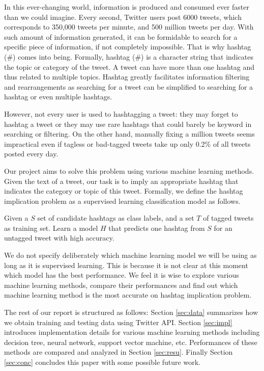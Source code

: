 \documentclass[letterpaper,11pt,twocolumn]{article}
\begin{document}
In this ever-changing world, information is produced and consumed ever faster than we could imagine. Every second, Twitter users post 6000 tweets, which corresponds to 350,000 tweets per minute, and 500 million tweets per day. With such amount of information generated, it can be formidable to search for a specific piece of information, if not completely impossible. That is why hashtag (\#) comes into being. Formally, hashtag (\#) is a character string that indicates the topic or category of the tweet. A tweet can have more than one hashtag and thus related to multiple topics. Hashtag greatly facilitates information filtering and rearrangements as searching for a tweet can be simplified to searching for a hashtag or even multiple hashtags.

However, not every user is used to hashtagging a tweet: they may forget to hashtag a tweet or they may use rare hashtags that could barely be keyword in searching or filtering. On the other hand, manually fixing a million tweets seems impractical even if tagless or bad-tagged tweets take up only 0.2\% of all tweets posted every day.

Our project aims to solve this problem using various machine learning methods. Given the text of a tweet, our task is to imply an appropriate hashtag that indicates the category or topic of this tweet. Formally, we define the hashtag implication problem as a supervised learning classification model as follows.

\begin{definition}
Given a $S$ set of candidate hashtags as class labels, and a set $T$ of tagged tweets as training set. Learn a model $H$ that predicts one hashtag from $S$ for an untagged tweet with high accuracy.
\end{definition}

We do not specify deliberately which machine learning model we will be using as long as it is supervised learning. This is because it is not clear at this moment which model has the best performance. We feel it is wise to explore various machine learning methods, compare their performances and find out which machine learning method is the most accurate on hashtag implication problem.

The rest of our report is structured as follows: Section \ref{sec:data} summarizes how we obtain training and testing data using Twitter API. Section \ref{sec:impl} introduces implementation details for various machine learning methods including decision tree, neural network, support vector machine, etc. Performances of these methods are compared and analyzed in Section \ref{sec:resu}. Finally Section \ref{sec:conc} concludes this paper with some possible future work.
\end{document}
